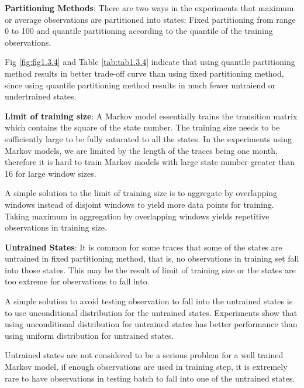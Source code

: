 \documentclass{article}
\begin{document}
\begin{flushleft}
\textbf{Partitioning Methods}: There are two ways in the experiments that maximum or average observations are partitioned into states; Fixed partitioning from range 0 to 100 and quantile partitioning according to the quantile of the training observations. 

Fig \ref{fig:fig1.3.4} and Table \ref{tab:tab1.3.4} indicate that using quantile partitioning method results in better trade-off curve than using fixed partitioning method, since using quantile partitioning method results in much fewer untraiend or undertrained states.
\end{flushleft}

\begin{flushleft}
  \textbf{Limit of training size}: A Markov model essentially trains the transition matrix which contains the square of the state number. The training size needs to be sufficiently large to be fully saturated to all the states. In the experiments using Markov models, we are limited by the length of the traces being one month, therefore it is hard to train Markov models with large state number greater than 16 for large window sizes.
  
  A simple solution to the limit of training size is to aggregate by overlapping windows instead of disjoint windows to yield more data points for training. Taking maximum in aggregation by overlapping windows yields repetitive observations in training size.
  \end{flushleft}
  
  \begin{flushleft}
  \textbf{Untrained States}: It is common for some traces that some of the states are untrained in fixed partitioning method, that is, no observations in training set fall into those states. This may be the result of limit of training size or the states are too extreme for observations to fall into. 
  
  A simple solution to avoid testing observation to fall into the untrained states is to use unconditional distribution for the untrained states. Experiments show that using unconditional distribution for untrained states has better performance than using uniform distribution for untrained states.
  
  Untrained states are not considered to be a serious problem for a well trained Markov model, if enough observations are used in training step, it is extremely rare to have observations in testing batch to fall into one of the untrained states.
  \end{flushleft}
\end{document}
